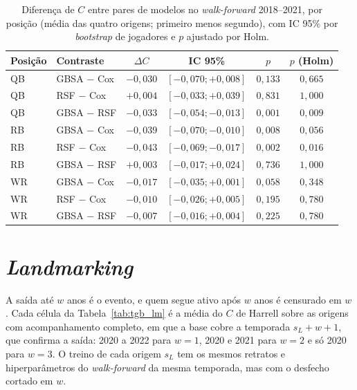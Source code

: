 \begin{table}[H]
\centering
\caption{Diferença de $C$ entre pares de modelos no \textit{walk-forward} 2018--2021, por posição (média das quatro origens; primeiro menos segundo), com IC 95\% por \textit{bootstrap} de jogadores e $p$ ajustado por Holm.}
\label{tab:tgb_delta}
\thesistablesetup
\begin{tabular*}{\textwidth}{@{\extracolsep{\fill}}llcccc@{}}
\toprule
\textbf{Posição} & \textbf{Contraste} & \textbf{$\Delta C$} & \textbf{IC 95\%} & \textbf{$p$} & \textbf{$p$ (Holm)} \\
\midrule
QB & GBSA $-$ Cox & $-0{,}030$ & $[-0{,}070; +0{,}008]$ & $0{,}133$ & $0{,}665$ \\
QB & RSF $-$ Cox & $+0{,}004$ & $[-0{,}033; +0{,}039]$ & $0{,}831$ & $1{,}000$ \\
QB & GBSA $-$ RSF & $-0{,}033$ & $[-0{,}054; -0{,}013]$ & $0{,}001$ & $0{,}009$ \\
\midrule
RB & GBSA $-$ Cox & $-0{,}039$ & $[-0{,}070; -0{,}010]$ & $0{,}008$ & $0{,}056$ \\
RB & RSF $-$ Cox & $-0{,}043$ & $[-0{,}069; -0{,}017]$ & $0{,}002$ & $0{,}016$ \\
RB & GBSA $-$ RSF & $+0{,}003$ & $[-0{,}017; +0{,}024]$ & $0{,}736$ & $1{,}000$ \\
\midrule
WR & GBSA $-$ Cox & $-0{,}017$ & $[-0{,}035; +0{,}001]$ & $0{,}058$ & $0{,}348$ \\
WR & RSF $-$ Cox & $-0{,}010$ & $[-0{,}026; +0{,}005]$ & $0{,}195$ & $0{,}780$ \\
WR & GBSA $-$ RSF & $-0{,}007$ & $[-0{,}016; +0{,}004]$ & $0{,}225$ & $0{,}780$ \\
\bottomrule
\end{tabular*}
\end{table}

\section{\textit{Landmarking}}
\label{sec:ap_landmark}

A saída até $w$ anos é o evento, e quem segue ativo após $w$ anos é censurado em $w$. Cada célula da Tabela~\ref{tab:tgb_lm} é a média do $C$ de Harrell sobre as origens com acompanhamento completo, em que a base cobre a temporada $s_L + w + 1$, que confirma a saída: 2020 a 2022 para $w = 1$, 2020 e 2021 para $w = 2$ e só 2020 para $w = 3$. O treino de cada origem $s_L$ tem os mesmos retratos e hiperparâmetros do \textit{walk-forward} da mesma temporada, mas com o desfecho cortado em $w$.


